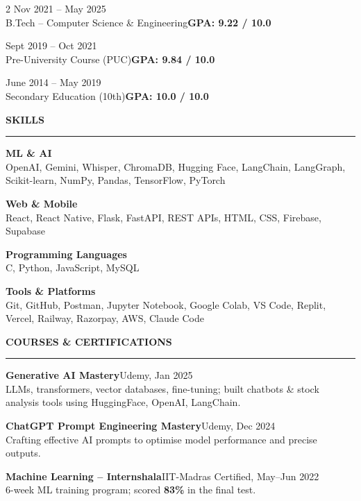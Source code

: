 \documentclass[10pt, a4paper]{article}
\newcommand{\rsection}[1]{%
  \vspace{4pt}%
  {\color{accent}\textbf{\small\MakeUppercase{#1}}}\\[-5pt]%
  {\color{rulecol}\rule{\linewidth}{0.8pt}}%
  \vspace{2.5pt}%
}
\newcommand{\skilllabel}[1]{%
  \vspace{2.5pt}%
  {\footnotesize\textbf{\color{accent}#1}}\\[1pt]%
}
\begin{document}
\begin{paracol}{2}
\hfill{\footnotesize\color{mutedtext}Nov 2021 -- May 2025}\\
{\small B.Tech -- Computer Science \& Engineering}\hfill{\small\textbf{GPA: 9.22 / 10.0}}

\vspace{6pt}
\hfill{\footnotesize\color{mutedtext}Sept 2019 -- Oct 2021}\\
{\small Pre-University Course (PUC)}\hfill{\small\textbf{GPA: 9.84 / 10.0}}

\vspace{6pt}
\hfill{\footnotesize\color{mutedtext}June 2014 -- May 2019}\\
{\small Secondary Education (10th)}\hfill{\small\textbf{GPA: 10.0 / 10.0}}

\rsection{Skills}

\skilllabel{ML \& AI}
{\footnotesize OpenAI, Gemini, Whisper, ChromaDB, Hugging Face, LangChain, LangGraph, Scikit-learn, NumPy, Pandas, TensorFlow, PyTorch}

\skilllabel{Web \& Mobile}
{\footnotesize React, React Native, Flask, FastAPI, REST APIs, HTML, CSS, Firebase, Supabase}

\skilllabel{Programming Languages}
{\footnotesize C, Python, JavaScript, MySQL}

\skilllabel{Tools \& Platforms}
{\footnotesize Git, GitHub, Postman, Jupyter Notebook, Google Colab, VS Code, Replit, Vercel, Railway, Razorpay, AWS, Claude Code}

\rsection{Courses \& Certifications}

{\footnotesize\textbf{Generative AI Mastery}}\hfill{\footnotesize\color{mutedtext}Udemy, Jan 2025}\\[1pt]
{\footnotesize LLMs, transformers, vector databases, fine-tuning; built chatbots \& stock
analysis tools using HuggingFace, OpenAI, LangChain.}

\vspace{2.5pt}
{\footnotesize\textbf{ChatGPT Prompt Engineering Mastery}}\hfill{\footnotesize\color{mutedtext}Udemy, Dec 2024}\\[1pt]
{\footnotesize Crafting effective AI prompts to optimise model performance and precise outputs.}

\vspace{2.5pt}
{\footnotesize\textbf{Machine Learning -- Internshala}}\hfill{\footnotesize\color{mutedtext}IIT-Madras Certified, May--Jun 2022}\\[1pt]
{\footnotesize 6-week ML training program; scored \textbf{83\%} in the final test.}


\end{paracol}
\end{document}
